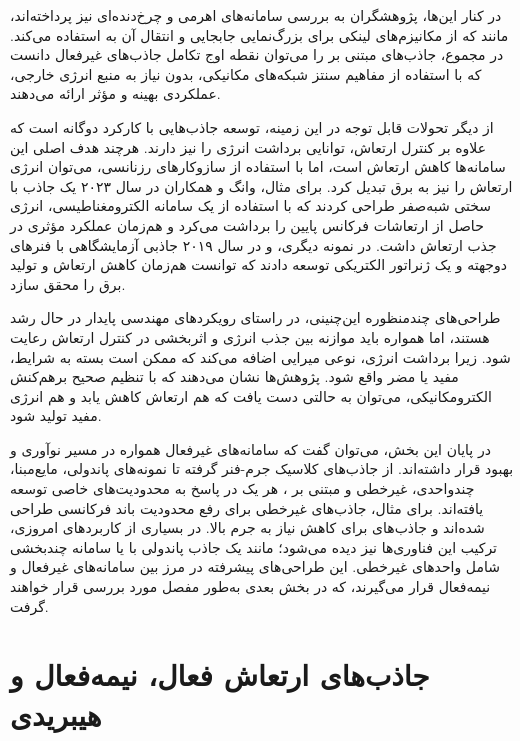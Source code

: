 در کنار این‌ها، پژوهشگران به بررسی سامانه‌های اهرمی و چرخ‌دنده‌ای نیز پرداخته‌اند، مانند  که از مکانیزم‌های لینکی برای بزرگ‌نمایی جابجایی و انتقال آن به  استفاده می‌کند. در مجموع، جاذب‌های مبتنی بر  را می‌توان نقطه اوج تکامل جاذب‌های غیرفعال دانست که با استفاده از مفاهیم سنتز شبکه‌های مکانیکی، بدون نیاز به منبع انرژی خارجی، عملکردی بهینه و مؤثر ارائه می‌دهند\cite{chowdhury2024critical}\cite{chen2019inerter}\cite{smith2020inerter}.

از دیگر تحولات قابل توجه در این زمینه، توسعه جاذب‌هایی با کارکرد دوگانه است که علاوه بر کنترل ارتعاش، توانایی برداشت انرژی را نیز دارند. هرچند هدف اصلی این سامانه‌ها کاهش ارتعاش است، اما با استفاده از سازوکارهای رزنانسی، می‌توان انرژی ارتعاش را نیز به برق تبدیل کرد. برای مثال، وانگ و همکاران در سال ۲۰۲۳ یک جاذب با سختی شبه‌صفر طراحی کردند که با استفاده از یک سامانه الکترومغناطیسی، انرژی حاصل از ارتعاشات فرکانس پایین را برداشت می‌کرد و هم‌زمان عملکرد مؤثری در جذب ارتعاش داشت\cite{wang2023dual}. در نمونه دیگری،  و  در سال ۲۰۱۹ جاذبی آزمایشگاهی با فنرهای دوجهته و یک ژنراتور الکتریکی توسعه دادند که توانست هم‌زمان کاهش ارتعاش و تولید برق را محقق سازد\cite{zoka2019double}.

طراحی‌های چندمنظوره این‌چنینی، در راستای رویکردهای مهندسی پایدار در حال رشد هستند، اما همواره باید موازنه بین جذب انرژی و اثربخشی در کنترل ارتعاش رعایت شود. زیرا برداشت انرژی، نوعی میرایی اضافه می‌کند که ممکن است بسته به شرایط، مفید یا مضر واقع شود. پژوهش‌ها نشان می‌دهند که با تنظیم صحیح برهم‌کنش الکترومکانیکی، می‌توان به حالتی دست یافت که هم ارتعاش کاهش یابد و هم انرژی مفید تولید شود\cite{qiu2018theoretical}\cite{huang2023towards}\cite{hasheminejad2024energy}\cite{yuan2018simultaneous}\cite{li2023bi}.

در پایان این بخش، می‌توان گفت که سامانه‌های  غیرفعال همواره در مسیر نوآوری و بهبود قرار داشته‌اند. از جاذب‌های کلاسیک جرم-فنر گرفته تا نمونه‌های پاندولی، مایع‌مبنا، چندواحدی، غیرخطی و مبتنی بر ، هر یک در پاسخ به محدودیت‌های خاصی توسعه یافته‌اند. برای مثال، جاذب‌های غیرخطی برای رفع محدودیت باند فرکانسی طراحی شده‌اند و جاذب‌های  برای کاهش نیاز به جرم بالا. در بسیاری از کاربردهای امروزی، ترکیب این فناوری‌ها نیز دیده می‌شود؛ مانند یک جاذب پاندولی با  یا سامانه چندبخشی شامل واحدهای غیرخطی. این طراحی‌های پیشرفته در مرز بین سامانه‌های غیرفعال و نیمه‌فعال قرار می‌گیرند، که در بخش بعدی به‌طور مفصل مورد بررسی قرار خواهند گرفت.

\section{جاذب‌های ارتعاش فعال، نیمه‌فعال و هیبریدی}

